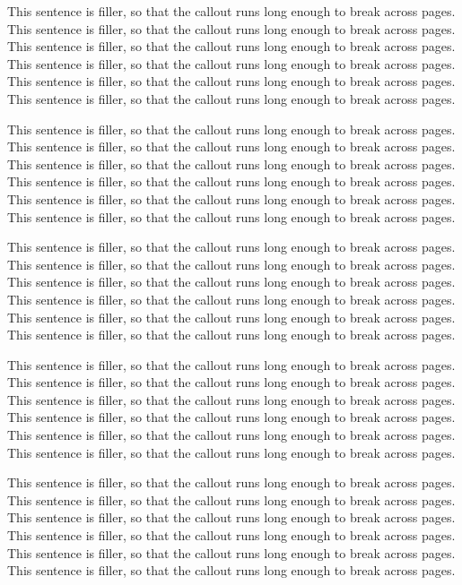 \begin{tcolorbox}
This sentence is filler, so that the callout runs long enough to break across pages. This sentence is filler, so that the callout runs long enough to break across pages. This sentence is filler, so that the callout runs long enough to break across pages. This sentence is filler, so that the callout runs long enough to break across pages. This sentence is filler, so that the callout runs long enough to break across pages. This sentence is filler, so that the callout runs long enough to break across pages.

This sentence is filler, so that the callout runs long enough to break across pages. This sentence is filler, so that the callout runs long enough to break across pages. This sentence is filler, so that the callout runs long enough to break across pages. This sentence is filler, so that the callout runs long enough to break across pages. This sentence is filler, so that the callout runs long enough to break across pages. This sentence is filler, so that the callout runs long enough to break across pages.

This sentence is filler, so that the callout runs long enough to break across pages. This sentence is filler, so that the callout runs long enough to break across pages. This sentence is filler, so that the callout runs long enough to break across pages. This sentence is filler, so that the callout runs long enough to break across pages. This sentence is filler, so that the callout runs long enough to break across pages. This sentence is filler, so that the callout runs long enough to break across pages.

This sentence is filler, so that the callout runs long enough to break across pages. This sentence is filler, so that the callout runs long enough to break across pages. This sentence is filler, so that the callout runs long enough to break across pages. This sentence is filler, so that the callout runs long enough to break across pages. This sentence is filler, so that the callout runs long enough to break across pages. This sentence is filler, so that the callout runs long enough to break across pages.

This sentence is filler, so that the callout runs long enough to break across pages. This sentence is filler, so that the callout runs long enough to break across pages. This sentence is filler, so that the callout runs long enough to break across pages. This sentence is filler, so that the callout runs long enough to break across pages. This sentence is filler, so that the callout runs long enough to break across pages. This sentence is filler, so that the callout runs long enough to break across pages.


\end{tcolorbox}
